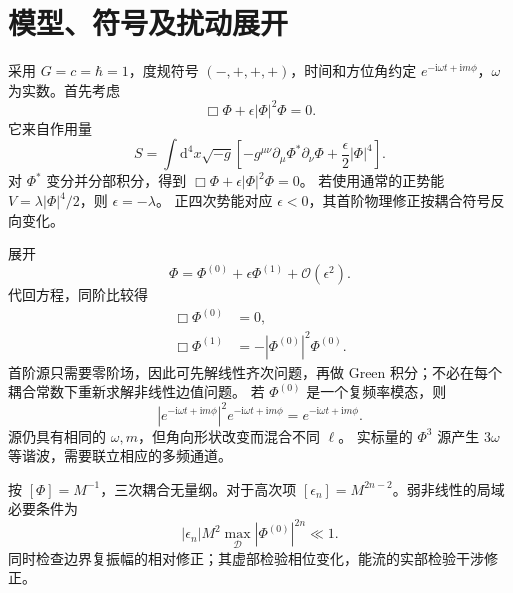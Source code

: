 \documentclass[UTF8,fontset=fandol,11pt,a4paper]{ctexart}
\newcommand{\ii}{\mathrm{i}}
\newcommand{\dd}{\mathrm{d}}
\newcommand{\calO}{\mathcal O}
\numberwithin{equation}{section}
\begin{document}
\section{模型、符号及扰动展开}
采用 $G=c=\hbar=1$，度规符号 $(-,+,+,+)$，时间和方位角约定
$e^{-\ii\omega t+\ii m\phi}$，$\omega$ 为实数。首先考虑
\begin{equation}\Box\Phi+\epsilon|\Phi|^2\Phi=0.\label{model}\end{equation}
它来自作用量
\begin{equation}
S=\int\dd^4x\sqrt{-g}\left[-g^{\mu\nu}\partial_\mu\Phi^*\partial_\nu\Phi
+\frac{\epsilon}{2}|\Phi|^4\right].
\end{equation}
对 $\Phi^*$ 变分并分部积分，得到 $\Box\Phi+\epsilon|\Phi|^2\Phi=0$。
若使用通常的正势能 $V=\lambda|\Phi|^4/2$，则 $\epsilon=-\lambda$。
正四次势能对应 $\epsilon<0$，其首阶物理修正按耦合符号反向变化。

展开
\begin{equation}
\Phi=\Phi^{(0)}+\epsilon\Phi^{(1)}+\calO(\epsilon^2).
\end{equation}
代回方程，同阶比较得
\begin{align}
\Box\Phi^{(0)}&=0,\\
\Box\Phi^{(1)}&=-|\Phi^{(0)}|^2\Phi^{(0)}.
\end{align}
首阶源只需要零阶场，因此可先解线性齐次问题，再做 Green 积分；不必在每个耦合常数下重新求解非线性边值问题。
若 $\Phi^{(0)}$ 是一个复频率模态，则
\begin{equation}
|e^{-\ii\omega t+\ii m\phi}|^2 e^{-\ii\omega t+\ii m\phi}
=e^{-\ii\omega t+\ii m\phi}.
\end{equation}
源仍具有相同的 $\omega,m$，但角向形状改变而混合不同 $\ell$。
实标量的 $\Phi^3$ 源产生 $3\omega$ 等谐波，需要联立相应的多频通道。

按 $[\Phi]=M^{-1}$，三次耦合无量纲。对于高次项
$[\epsilon_n]=M^{2n-2}$。弱非线性的局域必要条件为
\begin{equation}
|\epsilon_n|M^2\max_{\mathcal D}|\Phi^{(0)}|^{2n}\ll1.
\end{equation}
同时检查边界复振幅的相对修正；其虚部检验相位变化，能流的实部检验干涉修正。
\end{document}
